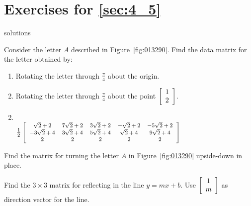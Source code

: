 \section*{Exercises for \ref{sec:4_5}}

\begin{Filesave}{solutions}
\end{Filesave}

\begin{multicols}{2}
\begin{ex}
Consider the letter $A$ described in Figure~\ref{fig:013290}. Find the data matrix for the letter obtained by:

\vspace{-1em}
\begin{enumerate}[label={\alph*.}]
\item Rotating the letter through $\frac{\pi}{4}$ about the origin.

\item Rotating the letter through $\frac{\pi}{4}$
 about the point $\left[
 \begin{array}{c}
 1\\
 2
 \end{array}
 \right]$.

\end{enumerate}
\begin{sol}
\begin{enumerate}[label={\alph*.}]
\setcounter{enumi}{1}
\item \hspace{1em} \\
\hspace*{-2em}${\footnotesize\tfrac{1}{2}\left[
\begin{array}{ccccc}
\sqrt{2} + 2 & 7\sqrt{2} + 2 & 3\sqrt{2} + 2 & -\sqrt{2} + 2 & -5\sqrt{2} + 2\\
-3\sqrt{2} + 4 & 3\sqrt{2} + 4 & 5\sqrt{2} + 4 & \sqrt{2} + 4 & 9\sqrt{2} + 4 \\
2 & 2 & 2 & 2 & 2
\end{array}
\right]}$

\end{enumerate}
\end{sol}
\end{ex}

\begin{ex}
Find the matrix for turning the letter $A$ in Figure~\ref{fig:013290} upside-down in place.
\end{ex}

\begin{ex}
Find the $3 \times 3$ matrix for reflecting in the line $y = mx + b$. Use $\left[
\begin{array}{c}
1\\
m
\end{array}
\right]$ as direction vector for the line.
\end{ex}


\end{multicols}
